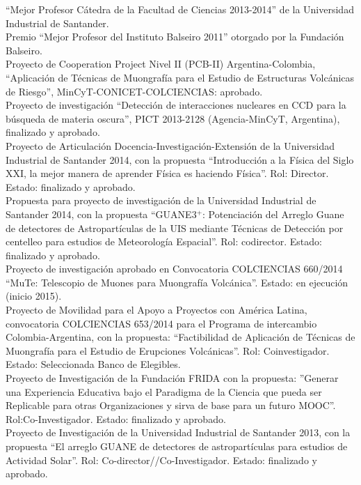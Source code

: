  ``Mejor Profesor Cátedra de la Facultad de Ciencias 2013-2014'' de la Universidad Industrial de Santander.\\
 Premio ``Mejor Profesor del Instituto Balseiro 2011'' otorgado por la Fundación Balseiro.\\
\ifres
\else
{} Proyecto de Cooperation Project Nivel II (PCB-II) Argentina-Colombia, ``Aplicación de Técnicas de Muongrafía para el Estudio de Estructuras Volcánicas de Riesgo'', MinCyT-CONICET-COLCIENCIAS: aprobado.\\
 Proyecto de investigación ``Detección de interacciones nucleares en CCD para la búsqueda de materia oscura'', PICT 2013-2128 (Agencia-MinCyT, Argentina), finalizado y aprobado.\\
 Proyecto de Articulación Docencia-Investigación-Extensión de la Universidad Industrial de Santander 2014, con la propuesta ``Introducción a la Física del Siglo XXI, la mejor manera de aprender Física es haciendo Física''. Rol: Director. Estado: finalizado y aprobado.\\
 Propuesta para proyecto de investigación de la Universidad Industrial de Santander 2014, con la propuesta ``GUANE3$^+$: Potenciación del Arreglo Guane de detectores de Astropartículas de la UIS mediante Técnicas de Detección por centelleo para estudios de Meteorología Espacial''. Rol: codirector. Estado: finalizado y aprobado.\\
 Proyecto de investigación aprobado en Convocatoria COLCIENCIAS 660/2014 ``MuTe: Telescopio de Muones para Muongrafía Volcánica''. Estado: en ejecución (inicio 2015).\\
 Proyecto de Movilidad para el Apoyo a Proyectos con América Latina, convocatoria COLCIENCIAS 653/2014 para el Programa de intercambio Colombia-Argentina, con la propuesta: ``Factibilidad de Aplicación de Técnicas de Muongrafía para el Estudio de Erupciones Volcánicas''. Rol: Coinvestigador. Estado: Seleccionada Banco de Elegibles.\\
 Proyecto de Investigación de la Fundación FRIDA con la propuesta: ''Generar una Experiencia Educativa bajo el Paradigma de la Ciencia que pueda ser Replicable para otras Organizaciones y sirva de base para un futuro MOOC''. Rol:Co-Investigador. Estado: finalizado y aprobado.\\
 Proyecto de Investigación de la Universidad Industrial de Santander 2013, con la propuesta ``El arreglo GUANE de detectores de astropartículas para estudios de Actividad Solar''. Rol: Co-director//Co-Investigador. Estado: finalizado y aprobado.\\
